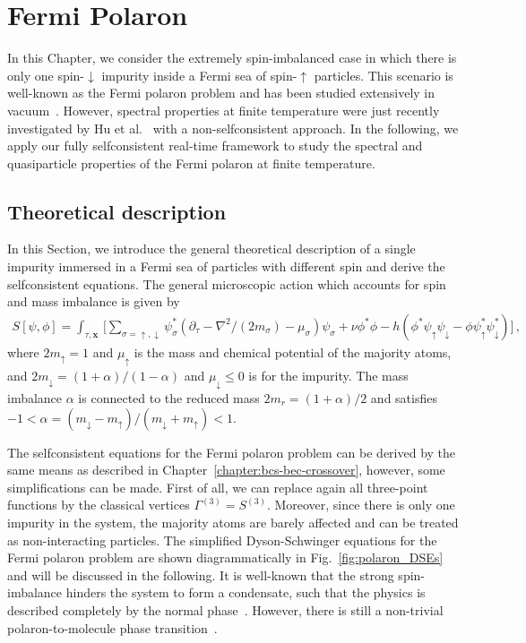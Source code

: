 \chapter{Fermi Polaron}
\label{chapter:fermi-polaron}

In this Chapter, we consider the extremely spin-imbalanced case in which there is only one spin-$\downarrow$ impurity inside a Fermi sea of spin-$\uparrow$ particles. This scenario is well-known as the Fermi polaron problem and has been studied extensively in vacuum~\cite{Schmidt2011,Kamikado2017}. However, spectral properties at finite temperature were just recently investigated by Hu et al.~\cite{Hu2022} with a non-selfconsistent approach. In the following, we apply our fully selfconsistent real-time framework to study the spectral and quasiparticle properties of the Fermi polaron at finite temperature.

\section{Theoretical description}
\label{section:polaron-theoretical-description}

In this Section, we introduce the general theoretical description of a single impurity immersed in a Fermi sea of particles with different spin and derive the selfconsistent equations. The general microscopic action which accounts for spin and mass imbalance is given by
%
\begin{align}
	\label{eq:polaron-action}
    S[\psi, \phi] = \int_{\tau,\bm{x}}\,
    \Big[ \sum_{\sigma=\uparrow,\downarrow} \psi^*_{\sigma} (\partial_{\tau} - \nabla^2/(2m_{\sigma}) - \mu_{\sigma}) \psi_{\sigma}
    + \nu \phi^* \phi - h (\phi^* \psi_{\uparrow} \psi_{\downarrow} - \phi \psi^*_{\uparrow} \psi^*_{\downarrow}) \Big] \,,
\end{align}
%
where $2m_{\uparrow} = 1$ and $\mu_{\uparrow}$ is the mass and chemical potential of the majority atoms, and $2m_{\downarrow} = (1+\alpha)/(1-\alpha)$ and $\mu_{\downarrow}\leq 0$ is for the impurity. The mass imbalance $\alpha$ is connected to the reduced mass $2m_r = (1+\alpha)/2$ and satisfies $-1 < \alpha = (m_{\downarrow}-m_{\uparrow})/(m_{\downarrow}+m_{\uparrow}) < 1$.

The selfconsistent equations for the Fermi polaron problem can be derived by the same means as described in Chapter~\ref{chapter:bcs-bec-crossover}, however, some simplifications can be made. First of all, we can replace again all three-point functions by the classical vertices $\Gamma^{(3)}=S^{(3)}$. Moreover, since there is only one impurity in the system, the majority atoms are barely affected and can be treated as non-interacting particles. The simplified Dyson-Schwinger equations for the Fermi polaron problem are shown diagrammatically in Fig.~\ref{fig:polaron_DSEs} and will be discussed in the following. It is well-known that the strong spin-imbalance hinders the system to form a condensate, such that the physics is described completely by the normal phase~\cite{Punk2010}. However, there is still a non-trivial polaron-to-molecule phase transition~\cite{Schmidt2013}.

